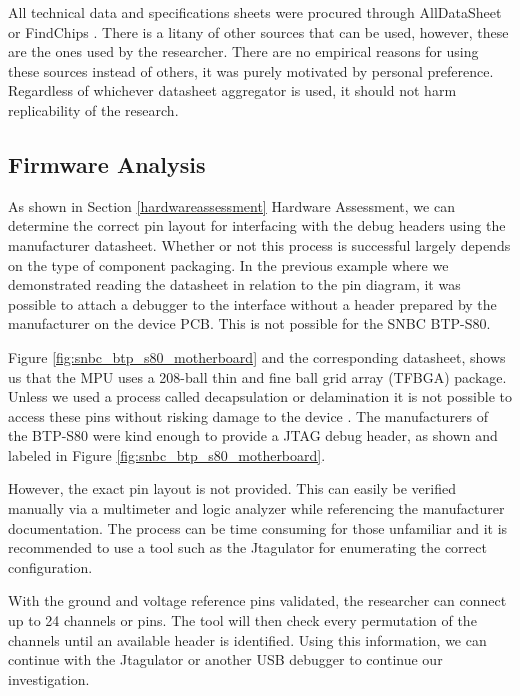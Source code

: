 All technical data and specifications sheets were procured through AllDataSheet or FindChips \autocite{ALLDATASHEETCOMElectronic,FindchipsElectronicPart}. There is a litany of other sources that can be used, however, these are the ones used by the researcher. There are no empirical reasons for using these sources instead of others, it was purely motivated by personal preference. Regardless of whichever datasheet aggregator is used, it should not harm replicability of the research.

\subsection{Firmware Analysis} \label{firmwareanalysis}



As shown in Section \ref{hardwareassessment} Hardware Assessment, we can determine the correct pin layout for interfacing with the debug headers using the manufacturer datasheet. Whether or not this process is successful largely depends on the type of component packaging. In the previous example where we demonstrated reading the datasheet in relation to the pin diagram, it was possible to attach a debugger to the interface without a header prepared by the manufacturer on the device PCB. This is not possible for the SNBC BTP-S80.

Figure \ref{fig:snbc_btp_s80_motherboard} and the corresponding datasheet, shows us that the MPU uses a 208-ball thin and fine ball grid array (TFBGA) package. Unless we used a process called decapsulation or delamination it is not possible to access these pins without risking damage to the device \autocite{sanchezlopezContributionStudyElectronic2015}. The manufacturers of the BTP-S80 were kind enough to provide a JTAG debug header, as shown and labeled in Figure \ref{fig:snbc_btp_s80_motherboard}.

However, the exact pin layout is not provided. This can easily be verified manually via a multimeter and logic analyzer while referencing the manufacturer documentation. The process can be time consuming for those unfamiliar and it is recommended to use a tool such as the Jtagulator \autocite{JTAGulator2023} for enumerating the correct configuration.

With the ground and voltage reference pins validated, the researcher can connect up to 24 channels or pins. The tool will then check every permutation of the channels until an available header is identified. Using this information, we can continue with the Jtagulator or another USB debugger to continue our investigation.
